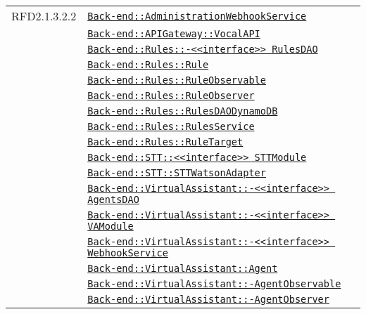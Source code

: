 \begin{longtable}{|>{\centering}m{3cm}|m{10cm}<{\centering}|}
RFD2.1.3.2.2 & \hyperref[Back-end::AdministrationWebhookService]{\texttt{Back-end::AdministrationWebhookService}}\\
& \hyperref[Back-end::APIGateway::VocalAPI]{\texttt{Back-end::APIGateway::VocalAPI}}\\
& \hyperref[Back-end::Rules::<<interface>> RulesDAO]{\texttt{Back-end::Rules::-\linebreak <<interface>> RulesDAO}}\\
& \hyperref[Back-end::Rules::Rule]{\texttt{Back-end::Rules::Rule}}\\
& \hyperref[Back-end::Rules::RuleObservable]{\texttt{Back-end::Rules::RuleObservable}}\\
& \hyperref[Back-end::Rules::RuleObserver]{\texttt{Back-end::Rules::RuleObserver}}\\
& \hyperref[Back-end::Rules::RulesDAODynamoDB]{\texttt{Back-end::Rules::RulesDAODynamoDB}}\\
& \hyperref[Back-end::Rules::RulesService]{\texttt{Back-end::Rules::RulesService}}\\
& \hyperref[Back-end::Rules::RuleTarget]{\texttt{Back-end::Rules::RuleTarget}}\\
& \hyperref[Back-end::STT::<<interface>> STTModule]{\texttt{Back-end::STT::<<interface>> STTModule}}\\
& \hyperref[Back-end::STT::STTWatsonAdapter]{\texttt{Back-end::STT::STTWatsonAdapter}}\\
& \hyperref[Back-end::VirtualAssistant::<<interface>> AgentsDAO]{\texttt{Back-end::VirtualAssistant::-\linebreak <<interface>> AgentsDAO}}\\
& \hyperref[Back-end::VirtualAssistant::<<interface>> VAModule]{\texttt{Back-end::VirtualAssistant::-\linebreak <<interface>> VAModule}}\\
& \hyperref[Back-end::VirtualAssistant::<<interface>> WebhookService]{\texttt{Back-end::VirtualAssistant::-\linebreak <<interface>> WebhookService}}\\
& \hyperref[Back-end::VirtualAssistant::Agent]{\texttt{Back-end::VirtualAssistant::Agent}}\\
& \hyperref[Back-end::VirtualAssistant::AgentObservable]{\texttt{Back-end::VirtualAssistant::-\linebreak AgentObservable}}\\
& \hyperref[Back-end::VirtualAssistant::AgentObserver]{\texttt{Back-end::VirtualAssistant::-\linebreak AgentObserver}}\\

\end{longtable}
